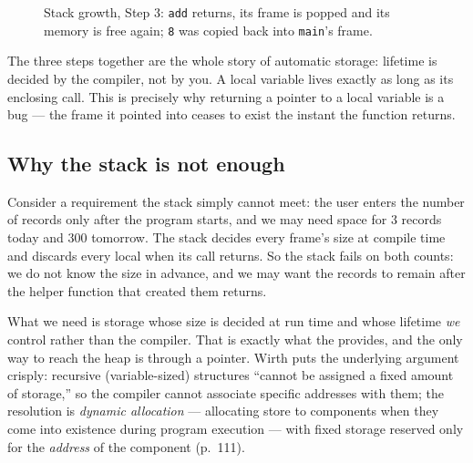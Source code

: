 \documentclass[11pt]{article}
\begin{document}
\begin{figure}[h]
  \centering
  \caption{Stack growth, Step 3: \texttt{add} returns, its frame is popped and
  its memory is free again; \texttt{8} was copied back into \texttt{main}'s
  frame.}
  \label{fig:stack3}
\end{figure}

The three steps together are the whole story of automatic storage: lifetime is
decided by the compiler, not by you. A local variable lives exactly as long as
its enclosing call. This is precisely why returning a pointer to a local
variable is a bug --- the frame it pointed into ceases to exist the instant the
function returns.

\subsection{Why the stack is not enough}

Consider a requirement the stack simply cannot meet: the user enters the number
of records only after the program starts, and we may need space for 3 records
today and 300 tomorrow. The stack decides every frame's size at compile time and
discards every local when its call returns. So the stack fails on both counts:
we do not know the size in advance, and we may want the records to remain after
the helper function that created them returns.

What we need is storage whose size is decided at run time and
whose lifetime \emph{we} control rather than the compiler. That is exactly what
the  provides, and the only way to reach the heap is through a
pointer. Wirth puts the underlying argument crisply: recursive (variable-sized)
structures ``cannot be assigned a fixed amount of storage,'' so the compiler
cannot associate specific addresses with them; the resolution is \emph{dynamic
allocation} --- allocating store to components when they come into existence
during program execution --- with fixed storage reserved only for the
\emph{address} of the component \cite{Wirth2004_algorithms_data_structures}
(p.~111).
\end{document}
